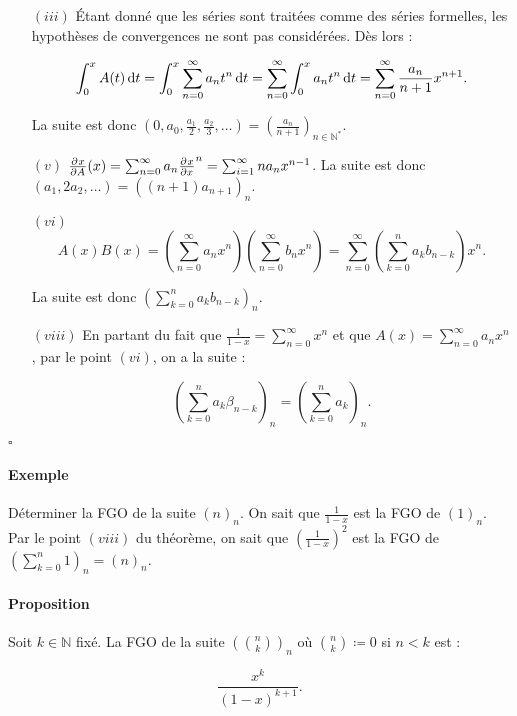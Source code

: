 \documentclass{article}
\begin{document}
			\begin{itemize}
				\item[$(iii)$]  Étant donné que les séries sont traitées comme des séries formelles, les hypothèses de convergences ne sont pas considérées. Dès lors :

				                \[\int_0^xA(t)\dif t = \int_0^x\sum_{n=0}^\infty a_nt^n\dif t = \sum_{n=0}^\infty\int_0^xa_nt^n\dif t = \sum_{n=0}^\infty\frac {a_n}{n+1}x^{n+1}.\]

								La suite est donc $\left(0, a_0, \frac {a_1}2, \frac {a_2}3, \ldots\right) = \left(\frac {a_n}{n+1}\right)_{n\in\mathbb N^*}$.
				\item[$(v)$]    $\pd xA(x) = \sum_{n=0}^\infty a_n\pd xx^n = \sum_{i=1}^\infty na_nx^{n-1}$. La suite est donc $(a_1, 2a_2, \ldots) = ((n+1)a_{n+1})_n$.
				\item[$(vi)$]   \[A(x)B(x) = \left(\sum_{n=0}^\infty a_nx^n\right)\left(\sum_{n=0}^\infty b_nx^n\right) = \sum_{n=0}^\infty \left(\sum_{k=0}^na_kb_{n-k}\right)x^n.\]

				                La suite est donc $\left(\sum_{k=0}^n a_kb_{n-k}\right)_n$.
				\item[$(viii)$] En partant du fait que $\frac 1{1-x} = \sum_{n=0}^\infty x^n$ et que $A(x) = \sum_{n=0}^\infty a_n x^n$, par le point $(vi)$, on a la suite :

				                \[\left(\sum_{k=0}^na_k\beta_{n-k}\right)_n = \left(\sum_{k=0}^na_k\right)_n.\]
			\end{itemize}

			\begin{flushright}$\square$\end{flushright}

			\paragraph{Exemple} Déterminer la FGO de la suite $(n)_n$. On sait que $\frac 1{1-x}$ est la FGO de $(1)_n$. Par le point $(viii)$ du théorème, on sait que 
			$\left(\frac 1{1-x}\right)^2$ est la FGO de $\left(\sum_{k=0}^n1\right)_n = (n)_n$.

			\paragraph{Proposition} Soit $k \in \mathbb N$ fixé. La FGO de la suite $\left(\binom nk\right)_n$ où $\binom nk \coloneqq 0$ si $n < k$ est :

			\[\frac {x^k}{(1-x)^{k+1}}.\]
\end{document}
